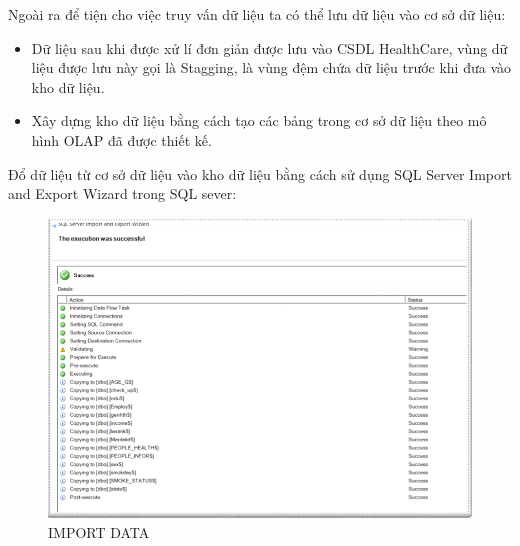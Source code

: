Ngoài ra để tiện cho việc truy vấn dữ liệu  ta có thể lưu dữ liệu vào cơ sở dữ liệu:\\
\begin{itemize}
    \item Dữ liệu sau khi được xử lí đơn giản được lưu vào CSDL HealthCare, vùng dữ liệu
được lưu này gọi là Stagging, là vùng đệm chứa dữ liệu trước khi đưa vào kho dữ liệu.
\item Xây dựng kho dữ liệu bằng cách tạo các bảng trong cơ sở dữ liệu theo mô hình OLAP
đã được thiết kế.

\end{itemize}
Đổ dữ liệu từ cơ sở dữ liệu vào kho dữ liệu bằng cách sử dụng SQL Server Import and Export Wizard trong SQL sever:\newpage
\begin{center}
            \begin{figure}[!h]
                \centering
                \includegraphics[scale = 0.9]{HONG/6.png} 
              \caption{IMPORT DATA}
            \end{figure}
\end{center}
